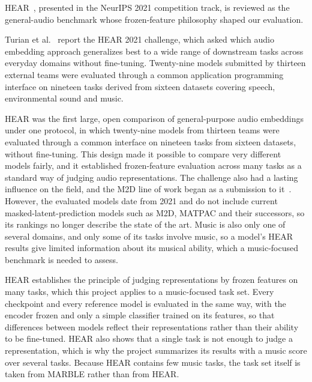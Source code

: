 \documentclass{FastFyp}
\begin{document}
HEAR~\cite{ref:Turian:2022hear}, presented in the NeurIPS 2021 competition track, is reviewed as the general-audio benchmark whose frozen-feature philosophy shaped our evaluation.

\lrsummary
Turian et al.~\cite{ref:Turian:2022hear} report the HEAR 2021 challenge, which asked which audio embedding approach generalizes best to a wide range of downstream tasks across everyday domains without fine-tuning. Twenty-nine models submitted by thirteen external teams were evaluated through a common application programming interface on nineteen tasks derived from sixteen datasets covering speech, environmental sound and music.

\lrcritical
HEAR was the first large, open comparison of general-purpose audio embeddings under one protocol, in which twenty-nine models from thirteen teams were evaluated through a common interface on nineteen tasks from sixteen datasets, without fine-tuning. This design made it possible to compare very different models fairly, and it established frozen-feature evaluation across many tasks as a standard way of judging audio representations. The challenge also had a lasting influence on the field, and the M2D line of work began as a submission to it~\cite{ref:Niizumi:2022msmmae}. However, the evaluated models date from 2021 and do not include current masked-latent-prediction models such as M2D, MATPAC and their successors, so its rankings no longer describe the state of the art. Music is also only one of several domains, and only some of its tasks involve music, so a model's HEAR results give limited information about its musical ability, which a music-focused benchmark is needed to assess.

\lrrelation
HEAR establishes the principle of judging representations by frozen features on many tasks, which this project applies to a music-focused task set. Every checkpoint and every reference model is evaluated in the same way, with the encoder frozen and only a simple classifier trained on its features, so that differences between models reflect their representations rather than their ability to be fine-tuned. HEAR also shows that a single task is not enough to judge a representation, which is why the project summarizes its results with a music score over several tasks. Because HEAR contains few music tasks, the task set itself is taken from MARBLE rather than from HEAR.

\end{document}
